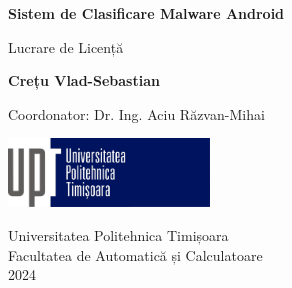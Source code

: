 \documentclass[12pt,a4paper]{report}
\begin{document}
\begin{titlepage}
      \centering
      \vspace*{1cm}

      \Huge
      \textbf{Sistem de Clasificare Malware Android}

      \vspace{0.5cm}
      \LARGE
      Lucrare de Licență

      \vspace{1.5cm}

      \textbf{Crețu Vlad-Sebastian}

      \vfill

      \Large
      Coordonator: Dr. Ing. Aciu Răzvan-Mihai

      \vspace{0.8cm}

      \includegraphics[width=0.4\textwidth]{visuals/university_logo.jpg}

      Universitatea Politehnica Timișoara\\
      Facultatea de Automatică și Calculatoare\\
      2024

\end{titlepage}

\tableofcontents
\end{document}
